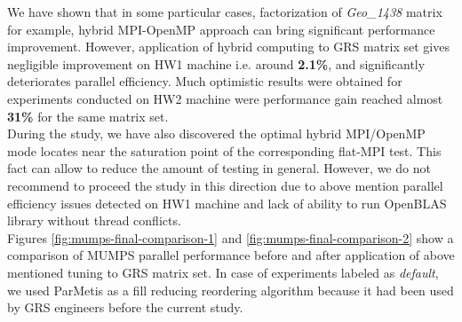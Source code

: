 We have shown that in some particular cases, factorization of \textit{Geo\_1438} matrix for example, hybrid MPI-OpenMP approach can bring significant performance improvement. However, application of hybrid computing to GRS matrix set gives negligible improvement on HW1 machine i.e. around \textbf{2.1\%}, and significantly deteriorates parallel efficiency. Much optimistic results were obtained for experiments conducted on HW2 machine were performance gain reached almost \textbf{31\%} for the same matrix set. \\


During the study, we have also discovered the optimal hybrid MPI/OpenMP mode locates near the saturation point of the corresponding flat-MPI test. This fact can allow to reduce the amount of testing in general. However, we do not recommend to proceed the study in this direction due to above mention parallel efficiency issues detected on HW1 machine and lack of ability to run OpenBLAS library without thread conflicts.\\


Figures \ref{fig:mumps-final-comparison-1} and \ref{fig:mumps-final-comparison-2} show a comparison of MUMPS parallel performance before and after application of above mentioned tuning to GRS matrix set. In case of experiments labeled as \textit{default}, we used ParMetis as a fill reducing reordering algorithm because it had been used by GRS engineers before the current study.\\


